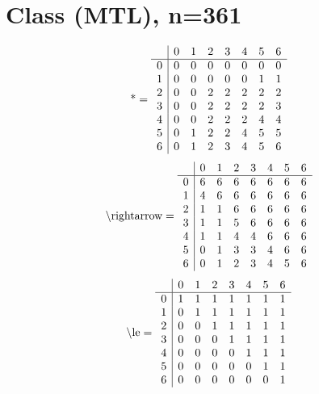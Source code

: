 \documentclass[11pt]{article}
\begin{document}
\section{Class (MTL), n=361}
\[\text{*} = 
\begin{array}{r | r r r r r r r}
 & 0 & 1 & 2 & 3 & 4 & 5 & 6 \\ \hline
0 & 0 & 0 & 0 & 0 & 0 & 0 & 0 \\
1 & 0 & 0 & 0 & 0 & 0 & 1 & 1 \\
2 & 0 & 0 & 2 & 2 & 2 & 2 & 2 \\
3 & 0 & 0 & 2 & 2 & 2 & 2 & 3 \\
4 & 0 & 0 & 2 & 2 & 2 & 4 & 4 \\
5 & 0 & 1 & 2 & 2 & 4 & 5 & 5 \\
6 & 0 & 1 & 2 & 3 & 4 & 5 & 6 \\
\end{array}
\]
\[\text{\textbackslash rightarrow} = 
\begin{array}{r | r r r r r r r}
 & 0 & 1 & 2 & 3 & 4 & 5 & 6 \\ \hline
0 & 6 & 6 & 6 & 6 & 6 & 6 & 6 \\
1 & 4 & 6 & 6 & 6 & 6 & 6 & 6 \\
2 & 1 & 1 & 6 & 6 & 6 & 6 & 6 \\
3 & 1 & 1 & 5 & 6 & 6 & 6 & 6 \\
4 & 1 & 1 & 4 & 4 & 6 & 6 & 6 \\
5 & 0 & 1 & 3 & 3 & 4 & 6 & 6 \\
6 & 0 & 1 & 2 & 3 & 4 & 5 & 6 \\
\end{array}
\]
\[\text{\textbackslash le} = 
\begin{array}{r | r r r r r r r}
 & 0 & 1 & 2 & 3 & 4 & 5 & 6 \\ \hline
0 & 1 & 1 & 1 & 1 & 1 & 1 & 1 \\
1 & 0 & 1 & 1 & 1 & 1 & 1 & 1 \\
2 & 0 & 0 & 1 & 1 & 1 & 1 & 1 \\
3 & 0 & 0 & 0 & 1 & 1 & 1 & 1 \\
4 & 0 & 0 & 0 & 0 & 1 & 1 & 1 \\
5 & 0 & 0 & 0 & 0 & 0 & 1 & 1 \\
6 & 0 & 0 & 0 & 0 & 0 & 0 & 1 \\
\end{array}
\]
\end{document}
